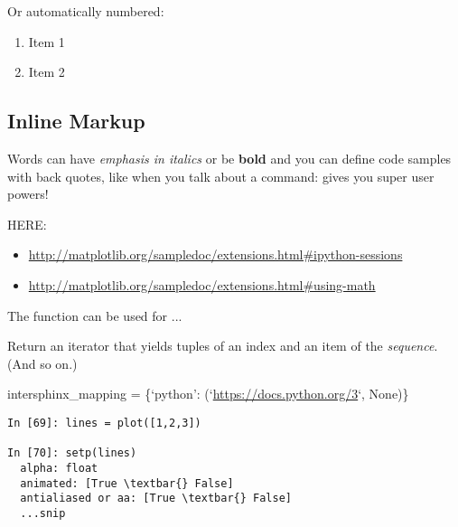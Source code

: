 \documentclass[letterpaper,10pt,english]{sphinxmanual}
\begin{document}
Or automatically numbered:
\begin{enumerate}
\item {} 
Item 1

\item {} 
Item 2

\end{enumerate}


\subsection{Inline Markup}
\label{Pyspark_Documentation:inline-markup}
Words can have \emph{emphasis in italics} or be \textbf{bold} and you can define
code samples with back quotes, like when you talk about a command: 
gives you super user powers!

HERE:
\begin{itemize}
\item {} 
\href{http://matplotlib.org/sampledoc/extensions.html\#ipython-sessions}{http://matplotlib.org/sampledoc/extensions.html\#ipython-sessions}

\item {} 
\href{http://matplotlib.org/sampledoc/extensions.html\#using-math}{http://matplotlib.org/sampledoc/extensions.html\#using-math}

\end{itemize}

The {\hyperref[Pyspark_Documentation:enumerate]{\emph{}}} function can be used for ...

\begin{fulllineitems}
\label{Pyspark_Documentation:enumerate}
Return an iterator that yields tuples of an index and an item of the
\emph{sequence}. (And so on.)

\end{fulllineitems}


intersphinx\_mapping = \{`python': (`\href{https://docs.python.org/3}{https://docs.python.org/3}`, None)\}

\begin{Verbatim}[commandchars=\\\{\}]
In [69]: lines = plot([1,2,3])

In [70]: setp(lines)
  alpha: float
  animated: [True \textbar{} False]
  antialiased or aa: [True \textbar{} False]
  ...snip
\end{Verbatim}
\end{document}
